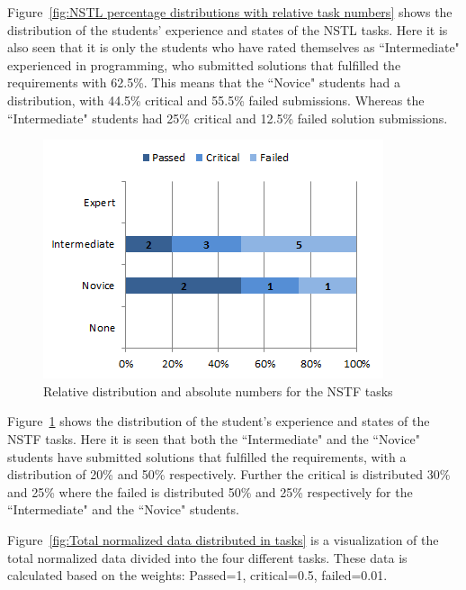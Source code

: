 \documentclass{sig-alternate-05-2015}
\begin{document}
Figure~\ref{fig:NSTL percentage distributions with relative task numbers} shows the distribution of the students' ex\-perience and states of the NSTL tasks. Here it is also seen that it is only the students who have rated themselves as ``Inter\-mediate" experienced in programming, who submitted solutions that fulfilled the requirements with 62.5\%. This means that the ``Novice" students had a distribution, with 44.5\% critical and 55.5\% failed submissions. Whereas the ``Inter\-mediate" students had 25\% critical and 12.5\% failed solution submissions.

\begin{figure}[!ht]
	\centering
	\includegraphics[width=1\linewidth]{img09}
	\caption{Relative distribution and absolute numbers for the NSTF tasks}
	\label{fig:NSTF percentage distributions with relative task numbers}
\end{figure}

Figure~\ref{fig:NSTF percentage distributions with relative task numbers} shows the distribution of the student's experience and states of the NSTF tasks. Here it is seen that both the ``Intermediate" and the ``Novice" students have submitted solutions that fulfilled the requirements, with a distribution of 20\% and 50\% respectively. Further the critical is distributed 30\% and 25\% where the failed is distributed 50\% and 25\% respectively for the ``Intermediate" and the ``Novice" students.

Figure~\ref{fig:Total normalized data distributed in tasks} is a visualization of the total normalized data divided into the four different tasks. These data is calculated based on the weights: Passed=1, critical=0.5, failed=0.01. %
\end{document}
